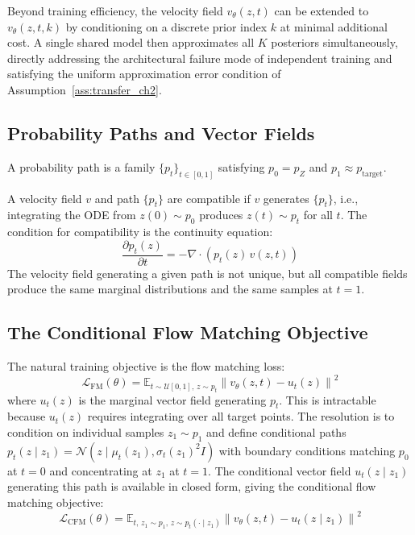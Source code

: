     Beyond training efficiency, the velocity field $v_\theta(z, t)$ can be extended to $v_\theta(z, t, k)$ by conditioning on a discrete prior index $k$ at minimal additional cost. A single shared model then approximates all $K$ posteriors simultaneously, directly addressing the architectural failure mode of independent training and satisfying the uniform approximation error condition of Assumption~\ref{ass:transfer_ch2}.

    \subsection{Probability Paths and Vector Fields}

    \begin{definition}
    \label{def:prob_path}
    A probability path is a family $\{p_t\}_{t \in [0,1]}$ satisfying $p_0 = p_Z$ and $p_1 \approx p_\text{target}$.
    \end{definition}

    A velocity field $v$ and path $\{p_t\}$ are compatible if $v$ generates $\{p_t\}$, i.e., integrating the ODE from $z(0) \sim p_0$ produces $z(t) \sim p_t$ for all $t$. The condition for compatibility is the continuity equation:
    \begin{equation}
        \frac{\partial p_t(z)}{\partial t} = -\nabla \cdot (p_t(z)\, v(z, t))
        \label{eq:continuity_fm}
    \end{equation}
    The velocity field generating a given path is not unique, but all compatible fields produce the same marginal distributions and the same samples at $t=1$.

    \subsection{The Conditional Flow Matching Objective}

    The natural training objective is the flow matching loss:
    \begin{equation}
        \mathcal{L}_\text{FM}(\theta) = \mathbb{E}_{t \sim \mathcal{U}[0,1],\, z \sim p_t} \left\| v_\theta(z, t) - u_t(z) \right\|^2
        \label{eq:fm_obj}
    \end{equation}
    where $u_t(z)$ is the marginal vector field generating $p_t$. This is intractable because $u_t(z)$ requires integrating over all target points. The resolution is to condition on individual samples $z_1 \sim p_1$ and define conditional paths $p_t(z \mid z_1) = \mathcal{N}(z \mid \mu_t(z_1), \sigma_t(z_1)^2 I)$ with boundary conditions matching $p_0$ at $t=0$ and concentrating at $z_1$ at $t=1$. The conditional vector field $u_t(z \mid z_1)$ generating this path is available in closed form, giving the conditional flow matching objective:
    \begin{equation}
        \mathcal{L}_\text{CFM}(\theta) = \mathbb{E}_{t,\, z_1 \sim p_1,\, z \sim p_t(\cdot \mid z_1)} \left\| v_\theta(z, t) - u_t(z \mid z_1) \right\|^2
        \label{eq:cfm_obj}
    \end{equation}

